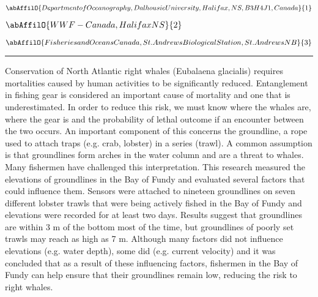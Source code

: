 \begin{minipage}{\linewidth}\begin{center}\begin{minipage}{\linewidth}
   \vspace{2 mm} \begin{center}
    \vspace{2 mm}\begin{center}
  
  $\abAffilO{Department of Oceanography, Dalhousie University, Halifax, NS, B3H 4J1, Canada}{1}$

  
  $\abAffilO{WWF-Canada, Halifax NS}{2}$

  
  $\abAffilO{Fisheries and Oceans Canada, St. Andrews Biological Station, St. Andrews NB}{3}$

  \end{center}
  \vspace{2 mm}
  \end{center}\end{minipage}\end{center}
  \begin{center}\rule{0.70\linewidth}{0.5 pt}\end{center}
  \begin{minipage}{\linewidth}
\noindent Conservation of North Atlantic right whales (Eubalaena glacialis) requires mortalities caused by human activities to be significantly reduced. Entanglement in fishing gear is considered an important cause of mortality and one that is underestimated. In order to reduce this risk, we must know where the whales are, where the gear is and the probability of lethal outcome if an encounter between the two occurs. An important component of this concerns the groundline, a rope used to attach traps (e.g. crab, lobster) in a series (trawl). A common assumption is that groundlines form arches in the water column and are a threat to whales. Many fishermen have challenged this interpretation. This research measured the elevations of groundlines in the Bay of Fundy and evaluated several factors that could influence them. Sensors were attached to nineteen groundlines on seven different lobster trawls that were being actively fished in the Bay of Fundy and elevations were recorded for at least two days. Results suggest that groundlines are within 3 m of the bottom most of the time, but groundlines of poorly set trawls may reach as high as 7 m. Although many factors did not influence elevations (e.g. water depth), some did (e.g. current velocity) and it was concluded that as a result of these influencing factors, fishermen in the Bay of Fundy can help ensure that their groundlines remain low, reducing the risk to right whales.
\end{minipage}\end{minipage}
